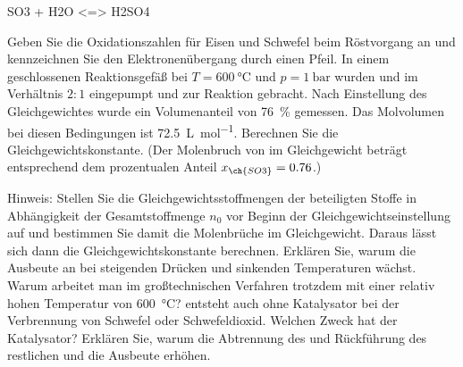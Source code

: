 \documentclass[DIV11]{scrartcl}
\begin{document}
\begin{question}[name=Technische Schwefelsäuresynthese]
\begin{enumerate}[label=\arabic*.]
\begin{itemize}
\begin{reaction*}
         SO3 + H2O <=> H2SO4
       \end{reaction*}
    \end{itemize}
\end{enumerate}
\begin{tasks}
  \task Geben Sie die Oxidationszahlen für Eisen und Schwefel beim Röstvorgang
    an und kennzeichnen Sie den Elektronenübergang durch einen Pfeil.
  \task In einem geschlossenen Reaktionsgefäß bei $T = \SI{600}{\celsius}$ und
    $p = \SI{1}{\bar}$ wurden  und  im Verhältnis $2:1$
    eingepumpt und zur Reaktion gebracht.  Nach Einstellung des
    Gleichgewichtes  wurde ein Volumenanteil von
    \SI{76}{\percent}  gemessen.  Das Molvolumen bei diesen
    Bedingungen ist \SI{72.5}{\liter\per\mole}.  Berechnen Sie die
    Gleichgewichtskonstante.  (Der Molenbruch von  im Gleichgewicht
    beträgt entsprechend dem prozentualen Anteil $x_{\ch{SO3}}=0.76$.)
    
    Hinweis: Stellen Sie die Gleichgewichtsstoffmengen der beteiligten Stoffe
    in Abhängigkeit der Gesamtstoffmenge $n_0$ vor Beginn der
    Gleichgewichtseinstellung auf und bestimmen Sie damit die Molenbrüche im
    Gleichgewicht.  Daraus lässt sich dann die Gleichgewichtskonstante
    berechnen.
  \task Erklären Sie, warum die Ausbeute an  bei steigenden Drücken
    und sinkenden Temperaturen wächst.
  \task Warum arbeitet man im großtechnischen Verfahren trotzdem mit einer
    relativ hohen Temperatur von \SI{600}{\celsius}?
  \task {} entsteht auch ohne Katalysator bei der Verbrennung von
    Schwefel oder Schwefeldioxid.  Welchen Zweck hat der Katalysator?
  \task Erklären Sie, warum die Abtrennung des  und Rückführung des
    restlichen  und  die Ausbeute erhöhen.
\end{tasks}
\end{question}
\end{document}
